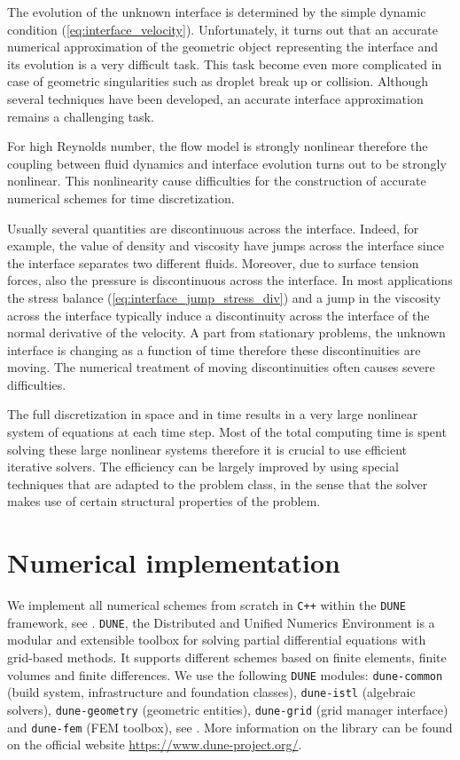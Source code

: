 The evolution of the unknown interface is determined by the simple dynamic
condition (\ref{eq:interface_velocity}). Unfortunately, it turns out that an
accurate numerical approximation of the geometric object representing the
interface and its evolution is a very difficult task. This task become even
more complicated in case of geometric singularities such as droplet break up or
collision. Although several techniques have been developed, an accurate
interface approximation remains a challenging task.

For high Reynolds number, the flow model is strongly nonlinear therefore the
coupling between fluid dynamics and interface evolution turns out to be strongly
nonlinear. This nonlinearity cause difficulties for the construction of
accurate numerical schemes for time discretization.

Usually several quantities are discontinuous across the interface. Indeed, for
example, the value of density and viscosity have jumps across the interface
since the interface separates two different fluids. Moreover, due to surface
tension forces, also the pressure is discontinuous across the interface. In
most applications the stress balance (\ref{eq:interface_jump_stress_div}) and a
jump in the viscosity across the interface typically induce a discontinuity
across the interface of the normal derivative of the velocity. A part from
stationary problems, the unknown interface is changing as a function of time
therefore these discontinuities are moving. The numerical treatment of moving
discontinuities often causes severe difficulties.

The full discretization in space and in time results in a very large nonlinear
system of equations at each time step. Most of the total computing time is
spent solving these large nonlinear systems therefore it is crucial to use
efficient iterative solvers. The efficiency can be largely improved by using
special techniques that are adapted to the problem class, in the sense that the
solver makes use of certain structural properties of the problem.

\section[Numerical implementation]{Numerical implementation}
We implement all numerical schemes from scratch in \verb|C++| within the
\verb|DUNE| framework, see \cite{dunegridpaperI08,dunegridpaperII08}.
\verb|DUNE|, the Distributed and Unified Numerics Environment is a modular and
extensible toolbox for solving partial differential equations with grid-based
methods. It supports different schemes based on finite elements, finite volumes
and finite differences. We use the following \verb|DUNE| modules:
\verb|dune-common| (build system, infrastructure and foundation classes),
\verb|dune-istl| (algebraic solvers), \verb|dune-geometry| (geometric
entities), \verb|dune-grid| (grid manager interface) and \verb|dune-fem| (FEM
toolbox), see \cite{dunefempaper10}. More information on the library can be
found on the official website \url{https://www.dune-project.org/}.

